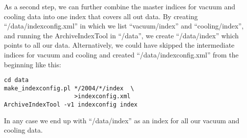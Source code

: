 As a second step, we can further combine the master indices for vacuum
and cooling data into one index that covers all out data. By creating
``/data/indexconfig.xml'' in which we list ``vacuum/index'' and
``cooling/index'', and running the ArchiveIndexTool in
``/data'', we create ``/data/index'' which points to all our data.
Alternatively, we could have skipped the intermediate indices for
vacuum and cooling and created ``/data/indexconfig.xml'' from the
beginning like this:
\begin{lstlisting}[frame=none,keywordstyle=\sffamily]
cd data
make_indexconfig.pl */2004/*/index  \
                    >indexconfig.xml
ArchiveIndexTool -v1 indexconfig index
\end{lstlisting}

\noindent In any case we end up with ``/data/index'' as an index for
all our vacuum and cooling data.
